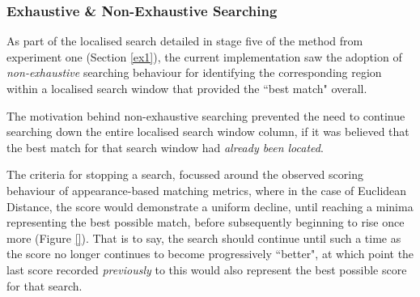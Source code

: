 \subsubsection{Exhaustive \& Non-Exhaustive Searching}
\label{searching}

As part of the localised search detailed in stage five of the method from experiment one (Section \ref{ex1}), the current implementation saw the adoption of \textit{non-exhaustive} searching behaviour for identifying the corresponding region within a localised search window that provided the ``best match" overall. 

The motivation behind non-exhaustive searching prevented the need to continue searching down the entire localised search window column, if it was believed that the best match for that search window had \textit{already been located}. 

The criteria for stopping a search, focussed around the observed scoring behaviour of appearance-based matching metrics, where in the case of Euclidean Distance, the score would demonstrate a uniform decline, until reaching a minima representing the best possible match, before subsequently beginning to rise once more (Figure \ref{}). That is to say, the search should continue until such a time as the score no longer continues to become progressively ``better", at which point the last score recorded \textit{previously} to this would also represent the best possible score for that search.

